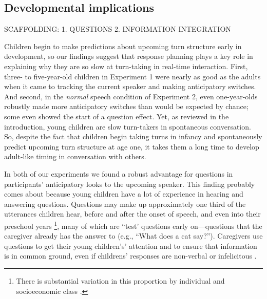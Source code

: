 \documentclass[authoryear, 12pt]{elsarticle}
\begin{document}
\subsection{Developmental implications}

SCAFFOLDING: 1. QUESTIONS 2. INFORMATION INTEGRATION

Children begin to make predictions about upcoming turn structure early in development, so our findings suggest that response planning plays a key role in explaining why they are so slow at turn-taking in real-time interaction. First, three- to five-year-old children in Experiment 1 were nearly as good as the adults when it came to tracking the current speaker and making anticipatory switches. And second, in the \textit{normal} speech condition of Experiment 2, even one-year-olds robustly made more anticipatory switches than would be expected by chance; some even showed the start of a question effect. Yet, as reviewed in the introduction, young children are slow turn-takers in spontaneous conversation. So, despite the fact that children begin taking turns in infancy and spontaneously predict upcoming turn structure at age one, it takes them a long time to develop adult-like timing in conversation with others. 

In both of our experiments we found a robust advantage for questions in participants' anticipatory looks to the upcoming speaker. This finding probably comes about because young children have a lot of experience in hearing and answering questions. Questions may make up approximately one third of the utterances children hear, before and after the onset of speech, and even into their preschool years \citep{fitneva2012, henning2005, shatz1979}\footnote{There is substantial variation in this proportion by individual and socioeconomic class \citep{hart1992}.}, many of which are ``test' questions early on---questions that the caregiver already has the answer to (e.g., ``What does a cat say?''). Caregivers use questions to get their young children's' attention and to ensure that information is in common ground, even if childrens' responses are non-verbal or infelicitous \citep{fitneva2012, snow1977}. 

\end{document}
